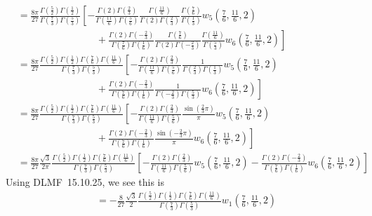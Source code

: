 \documentclass[11pt,a4paper,twoside,leqno,noamsfonts]{amsart}
\numberwithin{equation}{section}
\begin{document}
\begin{example}[Airy]
\begin{align*}
&=\frac{8\pi}{27} \frac{\Gamma(\tfrac{5}{2}) \Gamma(\tfrac{1}{2})}{\Gamma(\tfrac{7}{3}) \Gamma(\tfrac{5}{3})} \left[ -\frac{\Gamma(2) \Gamma(\tfrac{2}{3})}{\Gamma(\tfrac{11}{6}) \Gamma(\tfrac{5}{6})} \frac{\Gamma(\tfrac{11}{6})}{\Gamma(2) \Gamma(\tfrac{2}{3})} \frac{\Gamma(\tfrac{7}{6})}{\Gamma(\tfrac{1}{3})} w_5(\tfrac{7}{6}, \tfrac{11}{6}, 2) \right. \\
& \qquad\qquad\qquad\qquad + \left. \frac{\Gamma(2) \Gamma(-\tfrac{2}{3})}{\Gamma(\tfrac{7}{6}) \Gamma(\tfrac{1}{6})} \frac{\Gamma(\tfrac{7}{6})}{\Gamma(2) \Gamma(-\tfrac{2}{3})} \frac{\Gamma(\tfrac{11}{6})}{\Gamma(\tfrac{5}{3})} w_6(\tfrac{7}{6}, \tfrac{11}{6}, 2) \right] \\
&=\frac{8\pi}{27} \frac{\Gamma(\tfrac{5}{2}) \Gamma(\tfrac{1}{2}) \Gamma(\tfrac{7}{6}) \Gamma(\tfrac{11}{6})}{\Gamma(\tfrac{7}{3}) \Gamma(\tfrac{5}{3})} \left[ -\frac{\Gamma(2) \Gamma(\tfrac{2}{3})}{\Gamma(\tfrac{11}{6}) \Gamma(\tfrac{5}{6})} \frac{1}{\Gamma(\tfrac{2}{3}) \Gamma(\tfrac{1}{3})} w_5(\tfrac{7}{6}, \tfrac{11}{6}, 2) \right. \\
& \qquad\qquad\qquad\qquad + \left. \frac{\Gamma(2) \Gamma(-\tfrac{2}{3})}{\Gamma(\tfrac{7}{6}) \Gamma(\tfrac{1}{6})} \frac{1}{\Gamma(-\tfrac{2}{3}) \Gamma(\tfrac{5}{3})} w_6(\tfrac{7}{6}, \tfrac{11}{6}, 2) \right] \\
&=\frac{8\pi}{27} \frac{\Gamma(\tfrac{5}{2}) \Gamma(\tfrac{1}{2}) \Gamma(\tfrac{7}{6}) \Gamma(\tfrac{11}{6})}{\Gamma(\tfrac{7}{3}) \Gamma(\tfrac{5}{3})} \left[ -\frac{\Gamma(2) \Gamma(\tfrac{2}{3})}{\Gamma(\tfrac{11}{6}) \Gamma(\tfrac{5}{6})} \frac{\sin(\tfrac{2}{3} \pi)}{\pi} w_5(\tfrac{7}{6}, \tfrac{11}{6}, 2) \right. \\
& \qquad\qquad\qquad\qquad + \left. \frac{\Gamma(2) \Gamma(-\tfrac{2}{3})}{\Gamma(\tfrac{7}{6}) \Gamma(\tfrac{1}{6})} \frac{\sin(-\tfrac{2}{3} \pi)}{\pi} w_6(\tfrac{7}{6}, \tfrac{11}{6}, 2) \right] \\
&=\frac{8\pi}{27} \frac{\sqrt{3}}{2\pi} \frac{\Gamma(\tfrac{5}{2}) \Gamma(\tfrac{1}{2}) \Gamma(\tfrac{7}{6}) \Gamma(\tfrac{11}{6})}{\Gamma(\tfrac{7}{3}) \Gamma(\tfrac{5}{3})} \left[ -\frac{\Gamma(2) \Gamma(\tfrac{2}{3})}{\Gamma(\tfrac{11}{6}) \Gamma(\tfrac{5}{6})} w_5(\tfrac{7}{6}, \tfrac{11}{6}, 2) - \frac{\Gamma(2) \Gamma(-\tfrac{2}{3})}{\Gamma(\tfrac{7}{6}) \Gamma(\tfrac{1}{6})} w_6(\tfrac{7}{6}, \tfrac{11}{6}, 2) \right]
\end{align*}
Using DLMF~15.10.25, we see this is
\begin{align*}
&=-\frac{8}{27} \frac{\sqrt{3}}{2} \frac{\Gamma(\tfrac{5}{2}) \Gamma(\tfrac{1}{2}) \Gamma(\tfrac{7}{6}) \Gamma(\tfrac{11}{6})}{\Gamma(\tfrac{7}{3}) \Gamma(\tfrac{5}{3})} w_1(\tfrac{7}{6}, \tfrac{11}{6}, 2) \\

\end{align*}
\end{example}
\end{document}
